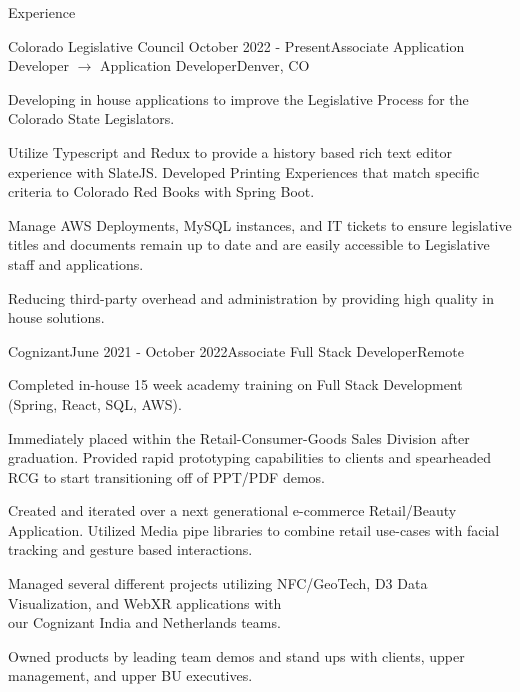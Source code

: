 \documentclass[
	11pt, %
]{resume} %
\begin{document}

\begin{rSection}{Experience}

	\begin{rSubsection}{Colorado Legislative Council }{October 2022 - Present}{Associate Application Developer $\rightarrow$ Application Developer}{Denver, CO}
		\item Developing in house applications to improve the Legislative Process for the Colorado State Legislators.
		\item Utilize Typescript and Redux to provide a history based rich text editor experience with SlateJS. Developed Printing Experiences that match specific criteria to Colorado Red Books with Spring Boot. 
		\item Manage AWS Deployments, MySQL instances, and IT tickets to ensure legislative titles and documents remain up to date and are easily accessible to Legislative staff and applications.
		\item Reducing third-party overhead and administration by providing high quality in house solutions.
	\end{rSubsection}

	\begin{rSubsection}{Cognizant}{June 2021 - October 2022}{Associate Full Stack Developer}{Remote}
		\item Completed in-house 15 week academy training on Full Stack Development (Spring, React, SQL, AWS).
		\item Immediately placed within the Retail-Consumer-Goods Sales Division after graduation. Provided rapid prototyping 		capabilities to clients and spearheaded RCG to start transitioning off of PPT/PDF demos.
		\item Created and iterated over a next generational e-commerce Retail/Beauty Application. Utilized Media pipe libraries to combine retail use-cases with facial tracking and gesture based interactions.
		\item Managed several different projects utilizing NFC/GeoTech, D3 Data Visualization, and WebXR applications with \\ our Cognizant India and Netherlands teams.
		\item Owned products by leading team demos and stand ups with clients, upper management, and upper BU executives.
	\end{rSubsection}

\end{rSection}
\end{document}
